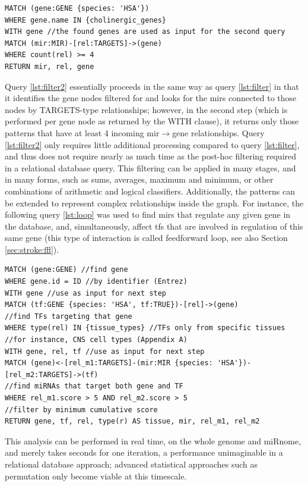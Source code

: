\begin{lstlisting}[label=lst:filter2,caption=Two-stage Filtering,
language=Cypher]
MATCH (gene:GENE {species: 'HSA'})
WHERE gene.name IN {cholinergic_genes}
WITH gene //the found genes are used as input for the second query
MATCH (mir:MIR)-[rel:TARGETS]->(gene)
WHERE count(rel) >= 4
RETURN mir, rel, gene
\end{lstlisting}

Query \ref{lst:filter2} essentially proceeds in the same way as query \ref{lst:filter} in that it identifies the gene nodes filtered for and looks for the \acp{mir} connected to those nodes by TARGETS-type relationships; however, in the second step (which is performed per gene node as returned by the \textcolor{dkblue}{WITH} clause), it returns only those patterns that have at least 4 incoming \ac{mir}$\to$gene relationships. Query \ref{lst:filter2} only requires little additional processing compared to query \ref{lst:filter}, and thus does not require nearly as much time as the post-hoc filtering required in a relational database query. This filtering can be applied in many stages, and in many forms, such as sums, averages, maximum and minimum, or other combinations of arithmetic and logical classifiers. Additionally, the patterns can be extended to represent complex relationships inside the graph. For instance, the following query \ref{lst:loop} was used to find \acp{mir} that regulate any given gene in the database, and, simultaneously, affect \acp{tf} that are involved in regulation of this same gene (this type of interaction is called feedforward loop, see also Section \ref{sec:stroke:ffl}).

\begin{lstlisting}[label=lst:loop,
caption=Feedforward Loop Identification,
language=Cypher]
MATCH (gene:GENE) //find gene
WHERE gene.id = ID //by identifier (Entrez)
WITH gene //use as input for next step
MATCH (tf:GENE {species: 'HSA', tf:TRUE})-[rel]->(gene) 
//find TFs targeting that gene
WHERE type(rel) IN {tissue_types} //TFs only from specific tissues
//for instance, CNS cell types (Appendix A)
WITH gene, rel, tf //use as input for next step
MATCH (gene)<-[rel_m1:TARGETS]-(mir:MIR {species: 'HSA'})-[rel_m2:TARGETS]->(tf) 
//find miRNAs that target both gene and TF
WHERE rel_m1.score > 5 AND rel_m2.score > 5 
//filter by minimum cumulative score
RETURN gene, tf, rel, type(r) AS tissue, mir, rel_m1, rel_m2
\end{lstlisting}

This analysis can be performed in real time, on the whole genome and miRnome, and merely takes seconds for one iteration, a performance unimaginable in a relational database approach; advanced statistical approaches such as permutation only become viable at this timescale.

